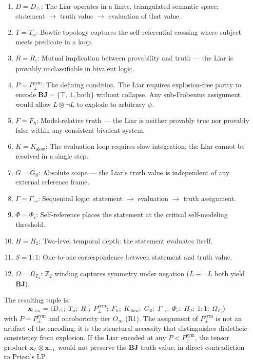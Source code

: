 \documentclass[12pt,a4paper]{article}
\newcommand{\xvec}{\mathbf{x}}
\newcommand{\Phic}{\Phi_c}
\newcommand{\Ppms}{P_{\pm}^{\text{sym}}}
\newcommand{\Oinf}{O_\infty}
\newcommand{\Tbw}{T_{\mathord{\bowtie}}}
\begin{document}
\begin{enumerate}
  \item \textbf{$D = D_\triangle$}: The Liar operates in a finite,
    triangulated semantic space: statement $\to$ truth value $\to$
    evaluation of that value.
  \item \textbf{$T = \Tbw$}: Bowtie topology captures the
    self-referential crossing where subject meets predicate in a loop.
  \item \textbf{$R = R_\dagger$}: Mutual implication between
    provability and truth --- the Liar is provably unclassifiable in
    bivalent logic.
  \item \textbf{$P = \Ppms$}: The defining condition. The Liar requires
    explosion-free parity to encode
    $\mathbf{BJ} = \{\top, \bot, \text{both}\}$ without collapse.
    Any sub-Frobenius assignment would allow $L \otimes \neg L$ to
    explode to arbitrary $\psi$.
  \item \textbf{$F = F_\hbar$}: Model-relative truth --- the Liar is
    neither provably true nor provably false within any consistent
    bivalent system.
  \item \textbf{$K = K_\text{slow}$}: The evaluation loop requires slow
    integration; the Liar cannot be resolved in a single step.
  \item \textbf{$G = G_\aleph$}: Absolute scope --- the Liar's truth
    value is independent of any external reference frame.
  \item \textbf{$\Gamma = \Gamma_{\to}$}: Sequential logic: statement
    $\to$ evaluation $\to$ truth assignment.
  \item \textbf{$\Phi = \Phic$}: Self-reference places the statement at
    the critical self-modeling threshold.
  \item \textbf{$H = H_2$}: Two-level temporal depth: the statement
    evaluates itself.
  \item \textbf{$S = 1{:}1$}: One-to-one correspondence between
    statement and truth value.
  \item \textbf{$\Omega = \Omega_{\mathbb{Z}_2}$}: $\mathbb{Z}_2$ winding
    captures symmetry under negation ($L \equiv \neg L$ both yield
    $\mathbf{BJ}$).
\end{enumerate}

The resulting tuple is:
\begin{equation}
  \xvec_\text{Liar} = \langle D_\triangle;\; \Tbw;\; R_\dagger;\; \Ppms;\;
  F_\hbar;\; K_\text{slow};\; G_\aleph;\; \Gamma_{\to};\; \Phic;\;
  H_2;\; 1{:}1;\; \Omega_{\mathbb{Z}_2} \rangle
  \label{eq:liar_full}
\end{equation}
with $P = \Ppms$ and ouroboricity tier $\Oinf$ (R1). The assignment of
$\Ppms$ is not an artifact of the encoding; it is the structural
necessity that distinguishes dialetheic consistency from explosion.
If the Liar encoded at any $P < \Ppms$, the tensor product
$\xvec_L \otimes \xvec_{\neg L}$ would not preserve the
$\mathbf{BJ}$ truth value, in direct contradiction to Priest's LP.
\end{document}
